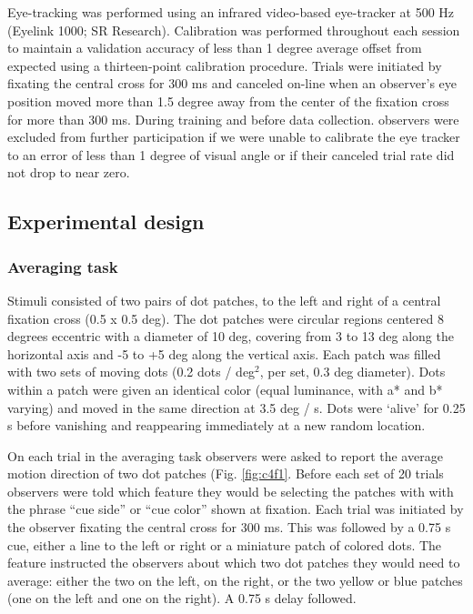 Eye-tracking was performed using an infrared video-based eye-tracker at 500 Hz (Eyelink 1000; SR Research). Calibration was performed throughout each session to maintain a validation accuracy of less than 1 degree average offset from expected using a thirteen-point calibration procedure. Trials were initiated by fixating the central cross for 300 ms and canceled on-line when an observer’s eye position moved more than 1.5 degree away from the center of the fixation cross for more than 300 ms. During training and before data collection. observers were excluded from further participation if we were unable to calibrate the eye tracker to an error of less than 1 degree of visual angle or if their canceled trial rate did not drop to near zero.

\subsection{Experimental design}

\subsubsection{Averaging task}

Stimuli consisted of two pairs of dot patches, to the left and right of a central fixation cross (0.5 x 0.5 deg). The dot patches were circular regions centered 8 degrees eccentric with a diameter of 10 deg, covering from 3 to 13 deg along the horizontal axis and -5 to +5 deg along the vertical axis. Each patch was filled with two sets of moving dots (0.2 dots / deg$^2$, per set, 0.3 deg diameter). Dots within a patch were given an identical color (equal luminance, with a* and b* varying) and moved in the same direction at 3.5 deg / s. Dots were `alive' for 0.25 s before vanishing and reappearing immediately at a new random location.

On each trial in the averaging task observers were asked to report the average motion direction of two dot patches (Fig. \ref{fig:c4f1}. Before each set of 20 trials observers were told which feature they would be selecting the patches with with the phrase ``cue side'' or ``cue color'' shown at fixation. Each trial was initiated by the observer fixating the central cross for 300 ms. This was followed by a 0.75 s cue, either a line to the left or right or a miniature patch of colored dots. The feature instructed the observers about which two dot patches they would need to average: either the two on the left, on the right, or the two yellow or blue patches (one on the left and one on the right). A 0.75 s delay followed. 

